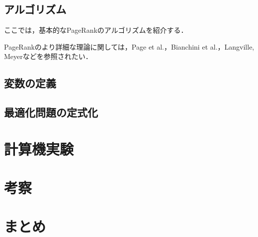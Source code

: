 \documentclass[a4j, dvipdfmx, twocolumn]{jsarticle}
\begin{document}
\subsection{アルゴリズム}
ここでは，基本的なPageRankのアルゴリズムを紹介する．


PageRankのより詳細な理論に関しては，Page et al.\cite{ilprints422}，Bianchini et al.\cite{bianchini2005inside}，Langville, Meyer\cite{langville2004deeper}などを参照されたい．

\subsection{変数の定義}

\subsection{最適化問題の定式化}

\section{計算機実験}

\section{考察}

\section{まとめ}




\end{document}
